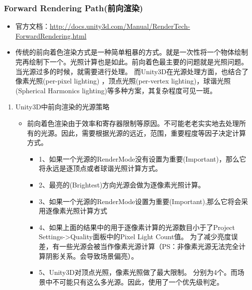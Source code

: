 \documentclass[9pt, b5paper]{article}
\begin{document}
\subsubsection{Forward Rendering Path(前向渲染)}
\label{sec:orgba813e2}
\begin{itemize}
\item 官方文档：\url{http://docs.unity3d.com/Manual/RenderTech-ForwardRendering.html}
\item 传统的前向着色渲染方式是一种简单粗暴的方式。就是一次性将一个物体绘制完再绘制下一个。光照计算也是如此。前向着色最主要的问题就是光照问题。当光源过多的时候，就需要进行处理。 而Unity3D在光源处理方面，也结合了像素光照(per-pixel lighting) ，顶点光照(per-vertex lighting)，球谐光照(Spherical Harmonics lighting)等多种方案，其复杂程度可见一斑。
\end{itemize}
\begin{enumerate}
\item Unity3D中前向渲染的光源策略
\label{sec:orgfe94154}
\begin{itemize}
\item 前向着色渲染由于效率和寄存器限制等原因。不可能老老实实地去处理所有的光源。因此，需要根据光源的远近，范围，重要程度等因子决定计算方式。
\begin{itemize}
\item 1、如果一个光源的RenderMode没有设置为重要(Important)，那么它将永远是逐顶点或者球谐光照计算方式。
\item 2、最亮的(Brightest)方向光源会做为逐像素光照计算。
\item 3、如果一个光源的RenderMode设置为重要(Important),那么它将会采用逐像素光照计算方式
\item 4、如果上面的结果中的用于逐像素计算的光源数目小于了Project Settings->Quality面板中的Pixel Light Count值。 为了减少亮度误差，有一些光源会被当作像素光源计算（PS：非像素光源无法完全计算阴影关系。会导致场景偏亮）。
\item 5、Unity3D对顶点光照，像素光照做了最大限制。 分别为4个。而场景中不可能只有这么多光源。因此，使用了一个优先级判定。
\end{itemize}


\end{itemize}
\end{enumerate}
\end{document}
